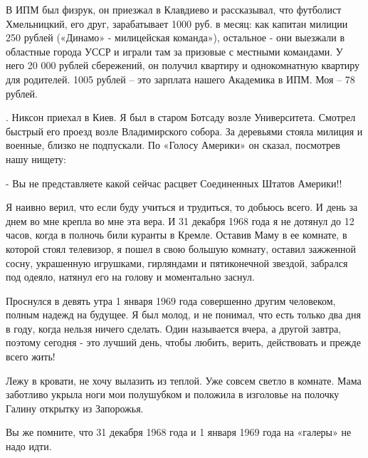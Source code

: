 В ИПМ был
физрук, он приезжал в Клавдиево и рассказывал, что футболист Хмельницкий, его
друг, зарабатывает 1000 руб. в месяц:  как капитан милиции 250 рублей («Динамо»
- милицейская команда»), остальное - они выезжали в областные города УССР и
играли там за призовые с местными командами. У него 20 000 рублей сбережений,
он получил квартиру и однокомнатную квартиру для родителей.  1005 рублей – это
зарплата нашего Академика в ИПМ. Моя – 78 рублей.                                


. Никсон приехал в Киев. Я был в старом Ботсаду возле Университета.
Смотрел быстрый его проезд возле Владимирского собора. За деревьями
стояла милиция и военные, близко не подпускали.  По «Голосу Америки» он
сказал, посмотрев  нашу нищету:

- Вы не представляете какой сейчас расцвет Соединенных Штатов
Америки!!

Я наивно верил, что если буду учиться и трудиться, то добьюсь всего.  И день за
днем во мне крепла во мне эта вера. И 31 декабря 1968 года я не дотянул до 12
часов, когда в полночь били куранты в Кремле. Оставив Маму в ее комнате, в
которой стоял телевизор, я пошел в свою большую комнату, оставил зажженной
сосну, украшенную игрушками, гирляндами и пятиконечной звездой, забрался под
одеяло, натянул его на голову и моментально заснул.


Проснулся в девять утра 1 января 1969 года совершенно другим человеком, полным
надежд на будущее. Я был молод, и не понимал, что есть только два дня в году,
когда нельзя ничего сделать. Один называется вчера, а другой завтра, поэтому
сегодня - это лучший день, чтобы любить, верить, действовать и прежде всего
жить!


Лежу в кровати, не хочу вылазить из теплой.  Уже совсем светло в комнате. Мама
заботливо укрыла ноги мои полушубком и положила в изголовье на полочку Галину
открытку из Запорожья.             

Вы же помните, что 31 декабря 1968 года и 1 января 1969 года на «галеры» не
надо идти.

